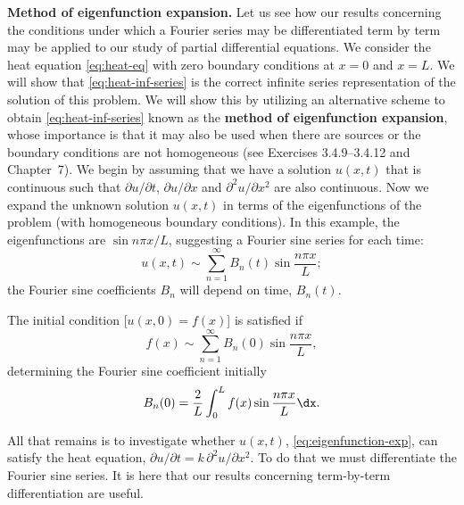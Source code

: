 \textbf{Method of eigenfunction expansion.}  Let us see how our results concerning the conditions under which a Fourier series may be differentiated term by term may be applied to our study of partial differential equations.  We consider the heat equation \eqref{eq:heat-eq} with zero boundary conditions at $x = 0$ and $x = L$.  We will show that \eqref{eq:heat-inf-series} is the correct infinite series representation of the solution of this problem.  We will show this by utilizing an alternative scheme to obtain \eqref{eq:heat-inf-series} known as the \textbf{method of eigenfunction expansion}, whose importance is that it may also be used when there are sources or the boundary conditions are not homogeneous (see Exercises 3.4.9--3.4.12 and Chapter~7).  We begin by assuming that we have a solution $u(x,t)$ that is continuous such that $\partial u/\partial t$, $\partial u/\partial x$ and $\partial^2 u/\partial x^2$ are also continuous.  Now we expand the unknown solution $u(x,t)$ in terms of the eigenfunctions of the problem (with homogeneous boundary conditions).  In this example, the eigenfunctions are $\sin n\pi x/L$, suggesting a Fourier sine series for each time:
\begin{equation}
\label{eq:eigenfunction-exp}
u(x,t) \sim \sum_{n=1}^{\infty} B_n(t) \sin \frac{n\pi x}{L};
\end{equation}
the Fourier sine coefficients $B_n$ will depend on time, $B_n(t)$.

The initial condition [$u(x,0) = f(x)$] is satisfied if
\begin{equation}
\label{eq:eigenfunction-ic}
f(x) \sim \sum_{n=1}^{\infty} B_n(0) \sin \frac{n\pi x}{L},
\end{equation}
determining the Fourier sine coefficient initially
\begin{equation}
\label{eq:Bn-initial}
B_n(0) = \frac{2}{L} \int_0^{L} f(x) \sin \frac{n\pi x}{L} \dx.
\end{equation}

All that remains is to investigate whether $u(x,t)$, \eqref{eq:eigenfunction-exp}, can satisfy the heat equation, $\partial u/\partial t = k\,\partial^2 u/\partial x^2$.  To do that we must differentiate the Fourier sine series.  It is here that our results concerning term-by-term differentiation are useful.

